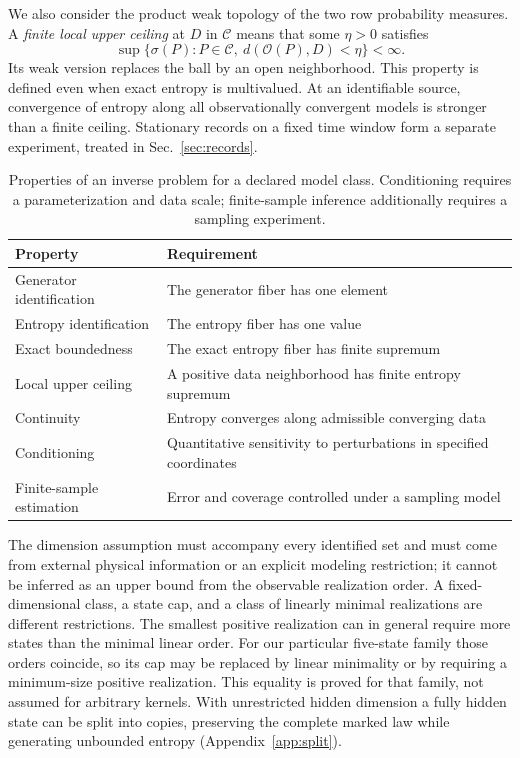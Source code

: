 \documentclass[aps,pre,onecolumn,11pt,longbibliography,notitlepage]{revtex4-2}
\newcommand{\1}{\mathbf 1}
\newcommand{\C}{\mathcal C}
\newcommand{\Obs}{\mathcal O}
\newcommand{\sig}{\sigma}
\begin{document}
We also consider the product weak topology of the two row probability measures. A \emph{finite local upper ceiling} at $D$ in $\C$ means that some $\eta>0$ satisfies
\begin{equation}
 \sup\{\sig(P):P\in\C,\ d(\Obs(P),D)<\eta\}<\infty.\label{eq:ceiling}
\end{equation}
Its weak version replaces the ball by an open neighborhood. This property is defined even when exact entropy is multivalued. At an identifiable source, convergence of entropy along all observationally convergent models is stronger than a finite ceiling. Stationary records on a fixed time window form a separate experiment, treated in Sec.~\ref{sec:records}.


\begin{table}[ht]
\caption{Properties of an inverse problem for a declared model class. Conditioning requires a parameterization and data scale; finite-sample inference additionally requires a sampling experiment.}\label{tab:hierarchy}
\begin{ruledtabular}
\begin{tabular}{ll}
Property & Requirement\\\hline
Generator identification & The generator fiber has one element\\
Entropy identification & The entropy fiber has one value\\
Exact boundedness & The exact entropy fiber has finite supremum\\
Local upper ceiling & A positive data neighborhood has finite entropy supremum\\
Continuity & Entropy converges along admissible converging data\\
Conditioning & Quantitative sensitivity to perturbations in specified coordinates\\
Finite-sample estimation & Error and coverage controlled under a sampling model
\end{tabular}
\end{ruledtabular}
\end{table}

The dimension assumption must accompany every identified set and must come from external physical information or an explicit modeling restriction; it cannot be inferred as an upper bound from the observable realization order. A fixed-dimensional class, a state cap, and a class of linearly minimal realizations are different restrictions. The smallest positive realization can in general require more states than the minimal linear order. For our particular five-state family those orders coincide, so its cap may be replaced by linear minimality or by requiring a minimum-size positive realization. This equality is proved for that family, not assumed for arbitrary kernels. With unrestricted hidden dimension a fully hidden state can be split into copies, preserving the complete marked law while generating unbounded entropy (Appendix~\ref{app:split}).
\end{document}
